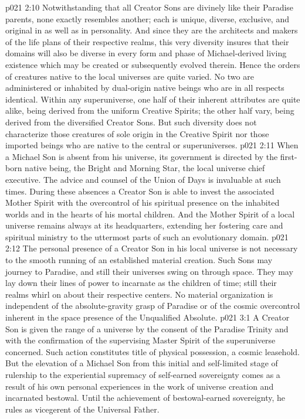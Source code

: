 \vs p021 2:10 Notwithstanding that all Creator Sons are divinely like their Paradise parents, none exactly resembles another; each is unique, diverse, exclusive, and original in  as well as in personality. And since they are the architects and makers of the life plans of their respective realms, this very diversity insures that their domains will also be diverse in every form and phase of Michael\hyp{}derived living existence which may be created or subsequently evolved therein. Hence the orders of creatures native to the local universes are quite varied. No two are administered or inhabited by dual\hyp{}origin native beings who are in all respects identical. Within any superuniverse, one half of their inherent attributes are quite alike, being derived from the uniform Creative Spirits; the other half vary, being derived from the diversified Creator Sons. But such diversity does not characterize those creatures of sole origin in the Creative Spirit nor those imported beings who are native to the central or superuniverses.
\vs p021 2:11 \pc When a Michael Son is absent from his universe, its government is directed by the first\hyp{}born native being, the Bright and Morning Star, the local universe chief executive. The advice and counsel of the Union of Days is invaluable at such times. During these absences a Creator Son is able to invest the associated Mother Spirit with the overcontrol of his spiritual presence on the inhabited worlds and in the hearts of his mortal children. And the Mother Spirit of a local universe remains always at its headquarters, extending her fostering care and spiritual ministry to the uttermost parts of such an evolutionary domain.
\vs p021 2:12 The personal presence of a Creator Son in his local universe is not necessary to the smooth running of an established material creation. Such Sons may journey to Paradise, and still their universes swing on through space. They may lay down their lines of power to incarnate as the children of time; still their realms whirl on about their respective centers. No material organization is independent of the absolute\hyp{}gravity grasp of Paradise or of the cosmic overcontrol inherent in the space presence of the Unqualified Absolute.
\vs p021 3:1 A Creator Son is given the range of a universe by the consent of the Paradise Trinity and with the confirmation of the supervising Master Spirit of the superuniverse concerned. Such action constitutes title of physical possession, a cosmic leasehold. But the elevation of a Michael Son from this initial and self\hyp{}limited stage of rulership to the experiential supremacy of self\hyp{}earned sovereignty comes as a result of his own personal experiences in the work of universe creation and incarnated bestowal. Until the achievement of bestowal\hyp{}earned sovereignty, he rules as vicegerent of the Universal Father.
